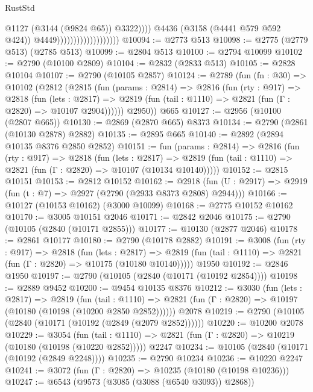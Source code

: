 \begin{lexlean}{RustStd}
\begin{coremodule}
                                                  @1127
                                                  (@3144 (@9824 @65))
                                                  @3322))))
                                          @4436
                                          (@3158 (@4441 @579 @592 @424))
                                          @4449)))))))))))))))))))
@10094 := @2773 @513
@10098 := @2775 (@2779 @513) (@2785 @513)
@10099 := @2804 @513
@10100 := @2794 @10099
@10102 := @2790 (@10100 @2809)
@10104 := @2832 (@2833 @513)
@10105 := @2828 @10104
@10107 := @2790 (@10105 @2857)
@10124 := @2789
    (fun (fn : @30) =>
    @10102
      (@2812
        (@2815
          (fun (params : @2814) =>
          @2816
            (fun (rty : @917) =>
            @2818
              (fun (lets : @2817) =>
              @2819 (fun (tail : @1110) => @2821 (fun (Γ : @2820) => @10107 @2904))))))
        @2950))
    @665
@10127 := @2956 (@10100 (@2807 @665))
@10130 := @2869 (@2870 @665) @8373
@10134 := @2790 (@2861 (@10130 @2878) @2882)
@10135 := @2895 @665
@10140 := @2892 (@2894 @10135 @8376 @2850 @2852)
@10151 := fun (params : @2814) =>
  @2816
    (fun (rty : @917) =>
    @2818
      (fun (lets : @2817) =>
      @2819 (fun (tail : @1110) => @2821 (fun (Γ : @2820) => @10107 (@10134 @10140)))))
@10152 := @2815 @10151
@10153 := @2812 @10152
@10162 := @2918 (fun (U : @2917) => @2919 (fun (t : @7) => @2927 (@2790 (@2933 @8373 @2808) @2944)))
@10166 := @10127 (@10153 @10162) (@3000 @10099)
@10168 := @2775 @10152 @10162
@10170 := @3005 @10151 @2046
@10171 := @2842 @2046
@10175 := @2790 (@10105 (@2840 (@10171 @2855)))
@10177 := @10130 (@2877 @2046)
@10178 := @2861 @10177
@10180 := @2790 (@10178 @2882)
@10191 := @3008
    (fun (rty : @917) =>
    @2818
      (fun (lets : @2817) =>
      @2819 (fun (tail : @1110) => @2821 (fun (Γ : @2820) => @10175 (@10180 @10140)))))
    @1950
@10192 := @2846 @1950
@10197 := @2790 (@10105 (@2840 (@10171 (@10192 @2854))))
@10198 := @2889 @9452
@10200 := @9454 @10135 @8376
@10212 := @3030
    (fun (lets : @2817) =>
    @2819
      (fun (tail : @1110) =>
      @2821 (fun (Γ : @2820) => @10197 (@10180 (@10198 (@10200 @2850 @2852))))))
    @2078
@10219 := @2790 (@10105 (@2840 (@10171 (@10192 (@2849 (@2079 @2852))))))
@10220 := @10200 @2078
@10229 := @3054
    (fun (tail : @1110) => @2821 (fun (Γ : @2820) => @10219 (@10180 (@10198 (@10220 @2852)))))
    @2247
@10234 := @10105 (@2840 (@10171 (@10192 (@2849 @2248))))
@10235 := @2790 @10234
@10236 := @10220 @2247
@10241 := @3072 (fun (Γ : @2820) => @10235 (@10180 (@10198 @10236)))
@10247 := @6543 (@9573 (@3085 (@3088 (@6540 @3093)) @2868))

\end{coremodule}
\end{lexlean}
